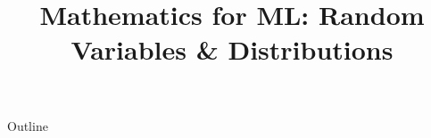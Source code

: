 \documentclass[xcolor=dvipsnames,compress,t,pdf,9pt]{beamer}
\title[\insertframenumber /\inserttotalframenumber]{Mathematics for ML: Random Variables \& Distributions}
\begin{document}
	\begin{frame}
	\titlepage
	\end{frame}

	\begin{frame}{Outline}
	    \tableofcontents
	\end{frame}

	
	
	
	
\end{document}

